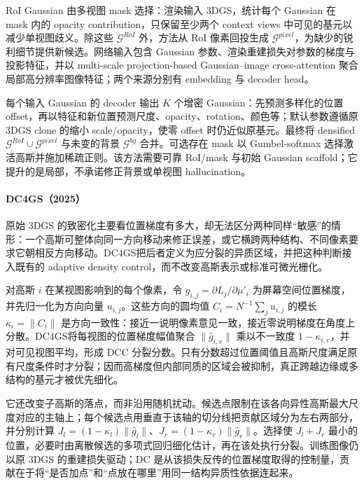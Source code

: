 RoI Gaussian 由多视图 mask 选择：渲染输入 3DGS，统计每个 Gaussian 在 mask 内的 opacity contribution，只保留至少两个 context views 中可见的基元以减少单视图歧义。除这些 $\mathcal G^{RoI}$ 外，方法从 RoI 像素回投生成 $\mathcal G^{pixel}$，为缺少的锐利细节提供新候选。网络输入包含 Gaussian 参数、渲染重建损失对参数的梯度与投影特征，并以 multi-scale projection-based Gaussian--image cross-attention 聚合局部高分辨率图像特征；两个来源分别有 embedding 与 decoder head。

每个输入 Gaussian 的 decoder 输出 $K$ 个增密 Gaussian：先预测多样化的位置 offset，再以特征和新位置预测尺度、opacity、rotation、颜色等；默认参数遵循原 3DGS clone 的缩小 scale/opacity，使零 offset 时仍近似原基元。最终将 densified $\mathcal G^{RoI}\cup\mathcal G^{pixel}$ 与未变的背景 $\mathcal G^{bg}$ 合并。可选存在 mask 以 Gumbel-softmax 选择激活高斯并施加稀疏正则。该方法需要可靠 RoI/mask 与初始 Gaussian scaffold；它提升的是局部，不承诺修正背景或单视图 hallucination。

\paragraph{DC4GS（2025）\cite{2510_26921}}
原始 3DGS 的致密化主要看位置梯度有多大，却无法区分两种同样“敏感”的情形：一个高斯可整体向同一方向移动来修正误差，或它横跨两种结构、不同像素要求它朝相反方向移动。DC4GS把后者定义为应分裂的异质区域，并把这种判断接入既有的 adaptive density control，而不改变高斯表示或标准可微光栅化。

对高斯 $i$ 在某视图影响到的每个像素，令 $g_{i,j}=\partial L_j/\partial\mu'_i$ 为屏幕空间位置梯度，并先归一化为方向向量 $u_{i,j}$。这些方向的圆均值 $C_i=N^{-1}\sum_j u_{i,j}$ 的模长 $\kappa_i=\lVert C_i\rVert$ 是方向一致性：接近一说明像素意见一致，接近零说明梯度在角度上分散。DC4GS将每视图的位置梯度幅值聚合 $\lVert\hat g_{i,v}\rVert$ 乘以不一致度 $1-\kappa_{i,v}$，并对可见视图平均，形成 DCC 分裂分数。只有分数超过位置阈值且高斯尺度满足原有尺度条件时才分裂；因而高梯度但内部同质的区域会被抑制，真正跨越边缘或多结构的基元才被优先细化。

它还改变子高斯的落点，而非沿用随机扰动。候选点限制在该各向异性高斯最大尺度对应的主轴上；每个候选点用垂直于该轴的切分线把贡献区域分为左右两部分，并分别计算 $J_l=(1-\kappa_l)\lVert\hat g_l\rVert$、$J_r=(1-\kappa_r)\lVert\hat g_r\rVert$。选择使 $J_l+J_r$ 最小的位置，必要时由离散候选的多项式回归细化估计，再在该处执行分裂。训练图像仍以原 3DGS 的重建损失驱动；DC 是从该损失反传的位置梯度取得的控制量，贡献在于将“是否加点”和“点放在哪里”用同一结构异质性依据连起来。

